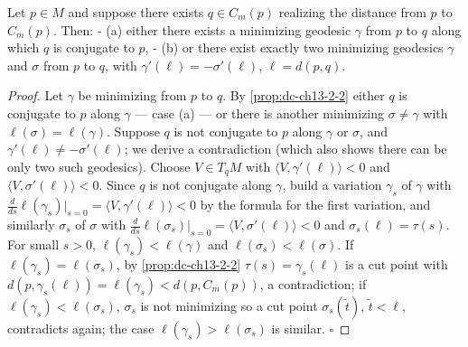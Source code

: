 \begin{proposition}
  \label{prop:dc-ch13-2-12}
  Let $p\in M$ and suppose there exists $q\in C_m(p)$ realizing the distance from $p$
  to $C_m(p)$. Then:
  - (a) either there exists a minimizing geodesic $\gamma$ from $p$ to $q$ along which
    $q$ is conjugate to $p$,
  - (b) or there exist exactly two minimizing geodesics $\gamma$ and $\sigma$ from $p$
    to $q$, with $\gamma'(\ell)=-\sigma'(\ell)$, $\ell=d(p,q)$.
\end{proposition}
\begin{proof}
  Let $\gamma$ be minimizing from $p$ to $q$. By \cref{prop:dc-ch13-2-2} either $q$
  is conjugate to $p$ along $\gamma$ — case (a) — or there is another minimizing
  $\sigma\neq\gamma$ with $\ell(\sigma)=\ell(\gamma)$. Suppose $q$ is not conjugate to
  $p$ along $\gamma$ or $\sigma$, and $\gamma'(\ell)\neq-\sigma'(\ell)$; we derive a
  contradiction (which also shows there can be only two such geodesics). Choose
  $V\in T_qM$ with $\langle V,\gamma'(\ell)\rangle<0$ and
  $\langle V,\sigma'(\ell)\rangle<0$. Since $q$ is not conjugate along $\gamma$, build
  a variation $\gamma_s$ of $\gamma$ with
  $\frac{d}{ds}\ell(\gamma_s)|_{s=0}=\langle V,\gamma'(\ell)\rangle<0$ by the formula
  for the first variation, and similarly $\sigma_s$ of $\sigma$ with
  $\frac{d}{ds}\ell(\sigma_s)|_{s=0}=\langle V,\sigma'(\ell)\rangle<0$ and
  $\sigma_s(\ell)=\tau(s)$. For small $s>0$, $\ell(\gamma_s)<\ell(\gamma)$ and
  $\ell(\sigma_s)<\ell(\sigma)$. If $\ell(\gamma_s)=\ell(\sigma_s)$, by \cref{prop:dc-ch13-2-2}
  $\tau(s)=\gamma_s(\ell)$ is a cut point with
  $d(p,\gamma_s(\ell))=\ell(\gamma_s)<d(p,C_m(p))$, a contradiction; if
  $\ell(\gamma_s)<\ell(\sigma_s)$, $\sigma_s$ is not minimizing so a cut point
  $\sigma_s(\tilde t)$, $\tilde t<\ell$, contradicts again; the case
  $\ell(\gamma_s)>\ell(\sigma_s)$ is similar. $\square$
\end{proof}

